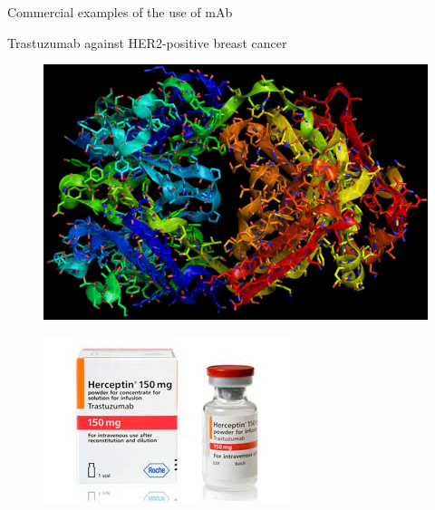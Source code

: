 \begin{frame}{Commercial examples of the use of mAb}
    \begin{block}{Trastuzumab against HER2-positive breast cancer}
        \vspace{1em}
        \begin{minipage}{0.495\textwidth}
            \begin{figure}
                \centering
                \includegraphics[width=\textwidth]{../Images/herceptin.jpg}
            \end{figure}  
        \end{minipage}\hfill
        \begin{minipage}{0.495\textwidth}
            \begin{figure}
                \centering
                \includegraphics[width=\textwidth]{../Images/trastuzumab.jpg}
            \end{figure}    
        \end{minipage}
    \end{block}
\end{frame}


